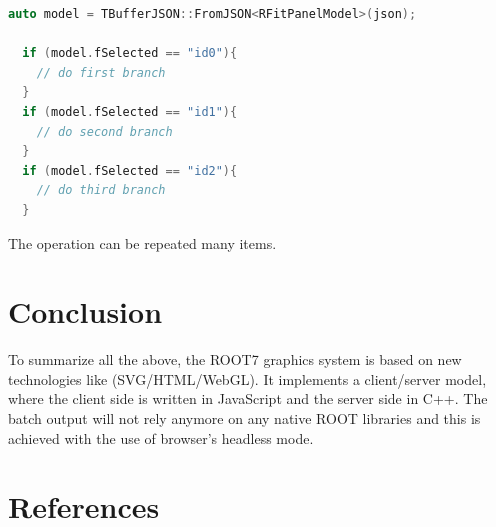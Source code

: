 \documentclass[a4paper]{jpconf}
\begin{document}
\begin{lstlisting}[language=C++]
  auto model = TBufferJSON::FromJSON<RFitPanelModel>(json);

  if (model.fSelected == "id0"){
    // do first branch
  }
  if (model.fSelected == "id1"){
    // do second branch
  }
  if (model.fSelected == "id2"){
    // do third branch
  }
\end{lstlisting}
\noindent
The operation can be repeated many items.


\section{Conclusion}

To summarize all the above, the ROOT7 graphics system is based on new technologies like (SVG/HTML/WebGL). It implements a client/server model, where the client side is written in JavaScript and the server side in C++. The batch output will not rely anymore on any native ROOT libraries and this is achieved with the use of browser's headless mode.




\section{References}

\end{document}
